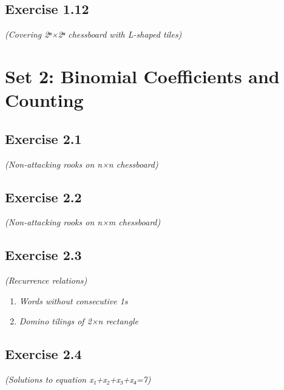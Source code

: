 \documentclass[12pt,a4paper]{article}
\begin{document}
\vspace{1cm}

\subsection*{Exercise 1.12}
\textit{(Covering 2ⁿ×2ⁿ chessboard with L-shaped tiles)}

\vspace{1cm}

\section{Set 2: Binomial Coefficients and Counting}

\subsection*{Exercise 2.1}
\textit{(Non-attacking rooks on n×n chessboard)}

\vspace{1cm}

\subsection*{Exercise 2.2}
\textit{(Non-attacking rooks on n×m chessboard)}

\vspace{1cm}

\subsection*{Exercise 2.3}
\textit{(Recurrence relations)}

\begin{enumerate}[label=(\roman*)]
\item \textit{Words without consecutive 1s}
\vspace{1cm}

\item \textit{Domino tilings of 2×n rectangle}
\vspace{1cm}
\end{enumerate}

\subsection*{Exercise 2.4}
\textit{(Solutions to equation x₁+x₂+x₃+x₄=7)}
\end{document}
